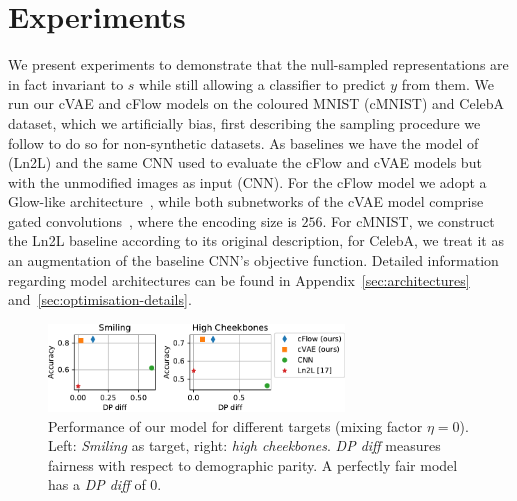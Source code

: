 
\section{Experiments}
\noindent We present experiments to demonstrate that the null-sampled representations are in fact invariant to $s$
while still allowing a classifier to predict $y$ from them.
We run our cVAE and cFlow models on the coloured MNIST (cMNIST) and CelebA dataset,
which we artificially bias, first describing the sampling procedure we follow to do so for non-synthetic datasets.
As baselines we have the model of~\cite{ln2l} (Ln2L) and the same CNN used to evaluate the cFlow and cVAE models
but with the unmodified images as input (CNN).
For the cFlow model we adopt a Glow-like architecture~\cite{KinDha18},
while both subnetworks of the cVAE model comprise gated convolutions~\cite{van2016conditional}, where the encoding size is $256$.
For cMNIST, we construct the Ln2L baseline according to its original description, for CelebA,
we treat it as an augmentation of the baseline CNN's objective function.
Detailed information regarding model architectures can be found in Appendix~\ref{sec:architectures} and~\ref{sec:optimisation-details}.
\begin{figure}[tb]
    \centering
    \includegraphics[width=0.7\textwidth]{./Figures/nosinn_celeba.pdf}
    \caption{
        Performance of our model for different targets (mixing factor $\eta=0$).
        Left: \emph{Smiling} as target, right: \emph{high cheekbones}.
        \emph{DP diff} measures fairness with respect to demographic parity.
        A perfectly fair model has a \emph{DP diff} of 0.
    }%
    \label{fig:celeba-targets}
\end{figure}

